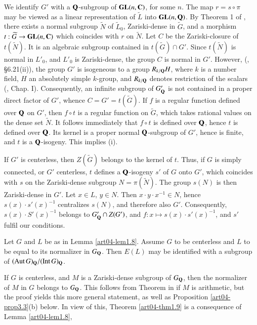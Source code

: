 We identify $G'$ with a $\mathbf{Q}$-subgroup of $\mathbf{GL}(n,\mathbf{C})$, for some $n$. The map $r=s\circ\pi$ may be viewed as a linear representation of $\widetilde{L}$ into $\mathbf{GL}(n,\mathbf{Q})$. By Theorem 1 of \cite{art04-key25}, there exists a normal subgroup $\widetilde{N}$ of $\widetilde{L}_{0}$, Zariski-dense in $\widetilde{G}$, and a morphism $t:\widetilde{G}\to \mathbf{GL}(n,\mathbf{C})$ which coincides with $r$ on $\widetilde{N}$. Let $C$ be the Zariski-closure of $t(\widetilde{N})$. It is an algebraic subgroup contained in $t(\widetilde{G})\cap G'$. Since $t(\widetilde{N})$ is normal in $L'_{0}$, and $L'_{0}$ is Zariski-dense, the group $C$ is normal in $G'$. However, (\cite{art04-key9}, \S6.21(ii)), the group $G'$ is isogeneous to a group $R_{k/\mathbf{Q}}H$, where $k$ is a number field, $H$ an absolutely simple $k$-group, and $R_{k/\mathbf{Q}}$ denotes restriction of the scalars (\cite{art04-key31}, Chap. I). Consequently, an infinite subgroup of $G'_{\mathbf{Q}}$ is not contained in a proper direct factor of $G'$, whence $C=G'=t(\widetilde{G})$. If $f$ is a regular function defined over $\mathbf{Q}$ on $G'$, then $f\circ t$ is a regular function on $\widetilde{G}$, which takes rational values on the dense set $\widetilde{N}$. It follows immediately that $f\circ t$ is defined over $\mathbf{Q}$, hence $t$ is defined over $\mathbf{Q}$. Its kernel is a proper normal $\mathbf{Q}$-subgroup of $G'$, hence is finite, and $t$ is a $\mathbf{Q}$-isogeny. This implies (i).

If $G'$ is centerless, then $Z(\widetilde{G})$ belongs to the kernel of $t$. Thus, if $G$ is simply connected, or $G'$ centerless, $t$ defines a $\mathbf{Q}$-isogeny $s'$ of $G$ onto $G'$, which coincides with $s$ on the Zariski-dense subgroup $N=\pi(\widetilde{N})$. The group $s(N)$ is then Zariski-dense in $G'$. Let $x\in L$, $y\in N$. Then $x\cdot y\cdot x^{-1}\in N$, hence $s(x)\cdot s'(x)^{-1}$ centralizes $s(N)$, and therefore also $G'$. Consequently, $s(x)\cdot S'(x)^{-1}$ belongs to $G'_{\mathbf{Q}}\cap Z(G')$, and $f:x\mapsto s(x)\cdot s'(x)^{-1}$, and $s'$ fulfil our conditions.

\begin{theorem}\label{art04-thm1.9}
Let $G$ and $L$ be as in Lemma \ref{art04-lem1.8}. Assume $G$ to be centerless and $L$ to be equal to its normalizer in $G_{\mathbf{Q}}$. Then $E(L)$ may be identified with a subgroup of $(\operatorname{\mathrm{Aut}} G)_{\mathbf{Q}}/(\operatorname{\mathrm{Int}} G)_{\mathbf{Q}}$.
\end{theorem}

If $G$ is centerless, and $M$ is a Zariski-dense subgroup of $G_{\mathbf{Q}}$, then the normalizer of $M$ in $G$ belongs to $G_{\mathbf{Q}}$. This follows from Theorem in \cite{art04-key6} if $M$ is arithmetic, but the proof yields this more general statement, as well as Proposition \ref{art04-prop3.3}(b) below. In view of this, Theorem \ref{art04-thm1.9} is a consequence of Lemma \ref{art04-lem1.8},

